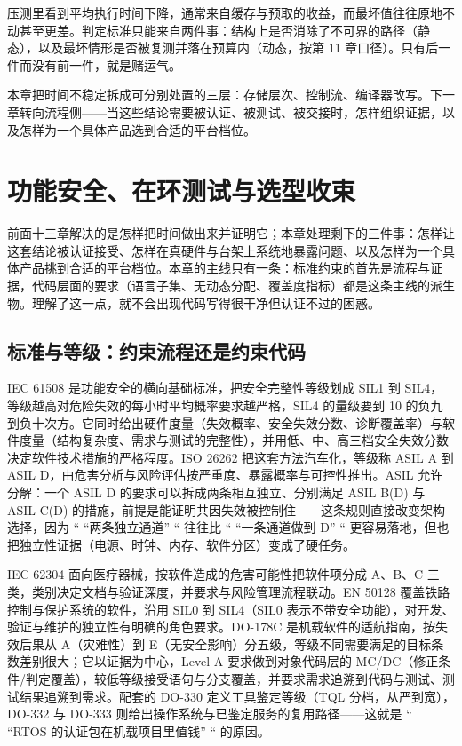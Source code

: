 \documentclass[12pt,a4paper,fontset=fandol]{ctexbook}
\begin{document}
\begin{warning}[title={把统计改善当成确定性提升}]
压测里看到平均执行时间下降，通常来自缓存与预取的收益，而最坏值往往原地不动甚至更差。判定标准只能来自两件事：结构上是否消除了不可界的路径（静态），以及最坏情形是否被复测并落在预算内（动态，按第 11 章口径）。只有后一件而没有前一件，就是赌运气。
\end{warning}

本章把时间不稳定拆成可分别处置的三层：存储层次、控制流、编译器改写。下一章转向流程侧——当这些结论需要被认证、被测试、被交接时，怎样组织证据，以及怎样为一个具体产品选到合适的平台档位。

\chapter{功能安全、在环测试与选型收束}
\label{ch:ch14-safety-hil}

前面十三章解决的是怎样把时间做出来并证明它；本章处理剩下的三件事：怎样让这套结论被认证接受、怎样在真硬件与台架上系统地暴露问题、以及怎样为一个具体产品挑到合适的平台档位。本章的主线只有一条：标准约束的首先是流程与证据，代码层面的要求（语言子集、无动态分配、覆盖度指标）都是这条主线的派生物。理解了这一点，就不会出现代码写得很干净但认证不过的困惑。

\section{标准与等级：约束流程还是约束代码}
\label{sec:ch14-standards}

IEC 61508 是功能安全的横向基础标准，把安全完整性等级划成 SIL1 到 SIL4，等级越高对危险失效的每小时平均概率要求越严格，SIL4 的量级要到 10 的负九到负十次方。它同时给出硬件度量（失效概率、安全失效分数、诊断覆盖率）与软件度量（结构复杂度、需求与测试的完整性），并用低、中、高三档安全失效分数决定软件技术措施的严格程度。ISO 26262 把这套方法汽车化，等级称 ASIL A 到 ASIL D，由危害分析与风险评估按严重度、暴露概率与可控性推出。ASIL 允许分解：一个 ASIL D 的要求可以拆成两条相互独立、分别满足 ASIL B(D) 与 ASIL C(D) 的措施，前提是能证明共因失效被控制住——这条规则直接改变架构选择，因为 `` ``两条独立通道'' `` 往往比 `` ``一条通道做到 D'' `` 更容易落地，但也把独立性证据（电源、时钟、内存、软件分区）变成了硬任务。

IEC 62304 面向医疗器械，按软件造成的危害可能性把软件项分成 A、B、C 三类，类别决定文档与验证深度，并要求与风险管理流程联动。EN 50128 覆盖铁路控制与保护系统的软件，沿用 SIL0 到 SIL4（SIL0 表示不带安全功能），对开发、验证与维护的独立性有明确的角色要求。DO-178C 是机载软件的适航指南，按失效后果从 A（灾难性）到 E（无安全影响）分五级，等级不同需要满足的目标条数差别很大；它以证据为中心，Level A 要求做到对象代码层的 MC/DC（修正条件/判定覆盖），较低等级接受语句与分支覆盖，并要求需求追溯到代码与测试、测试结果追溯到需求。配套的 DO-330 定义工具鉴定等级（TQL 分档，从严到宽），DO-332 与 DO-333 则给出操作系统与已鉴定服务的复用路径——这就是 `` ``RTOS 的认证包在机载项目里值钱'' `` 的原因。
\end{document}
